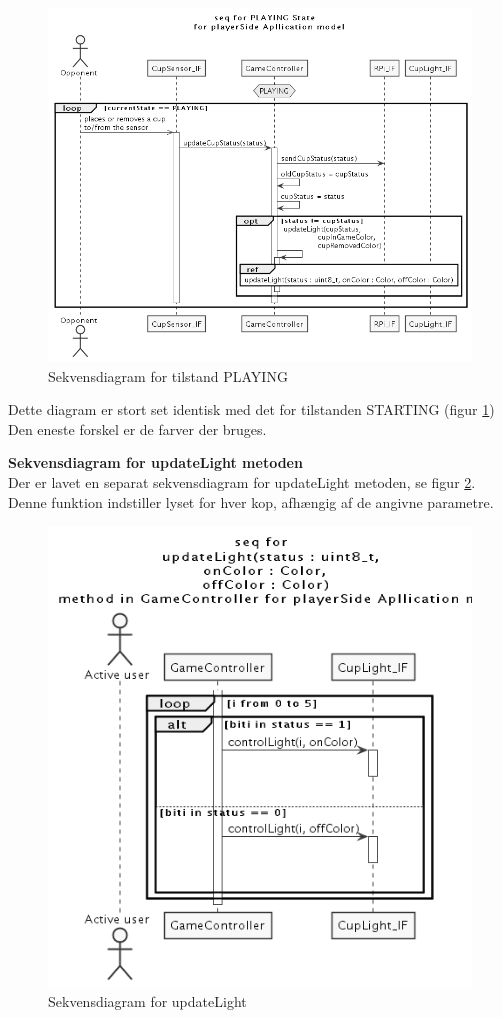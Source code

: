 \documentclass[Arkitektur/System_main.tex]{subfiles}
\begin{document}
\begin{figure}[H]
    \centering
    \includegraphics[width=\textwidth]{Arkitektur/Softwarearkitektur/Applikationsmodel/PlayerSide/graphics/UC2_sequence.png}
    \caption{Sekvensdiagram for tilstand PLAYING}
    \label{fig:playerSide_PLAYING_SD}
\end{figure}
Dette diagram er stort set identisk med det for tilstanden STARTING (figur \ref{fig:playerSide_PLAYING_SD}) Den eneste forskel er de farver der bruges. 

\textbf{Sekvensdiagram for updateLight metoden}\\
Der er lavet en separat sekvensdiagram for updateLight metoden, se figur \ref{fig:playerSide_updateLight_SD}. Denne funktion indstiller lyset for hver kop, afhængig af de angivne parametre. 

\begin{figure}[H]
    \centering
    \includegraphics[width=\textwidth]{Arkitektur/Softwarearkitektur/Applikationsmodel/PlayerSide/graphics/updateLight_sequence.png}
    \caption{Sekvensdiagram for updateLight}
    \label{fig:playerSide_updateLight_SD}
\end{figure}
\end{document}
